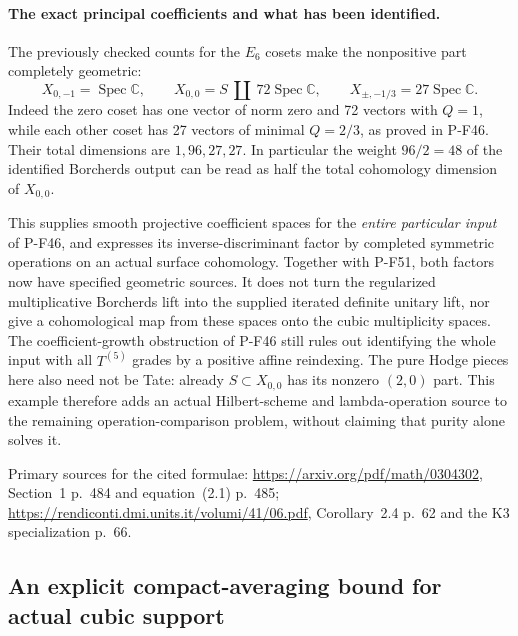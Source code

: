 \documentclass[11pt,a4paper]{article}
\begin{document}
\paragraph{The exact principal coefficients and what has been identified.}
The previously checked counts for the $E_6$ cosets
make the nonpositive part completely geometric:
\[
 X_{0,-1}=\operatorname{Spec}\mathbb C,\qquad
 X_{0,0}=S\ \coprod\ 72\operatorname{Spec}\mathbb C,
 \qquad
 X_{\pm,-1/3}=27\operatorname{Spec}\mathbb C.
                                                        \tag{P-F53g}
\]
Indeed the zero coset has one vector of norm zero
and 72 vectors with $Q=1$, while each other coset
has 27 vectors of minimal $Q=2/3$, as proved in
P-F46. Their total dimensions are $1,96,27,27$.
In particular the weight $96/2=48$ of the identified
Borcherds output can be read as half the total
cohomology dimension of $X_{0,0}$.

This supplies smooth projective coefficient spaces
for the \emph{entire particular input} of P-F46,
and expresses its inverse-discriminant factor by
completed symmetric operations on an actual
surface cohomology. Together with P-F51, both
factors now have specified geometric sources.
It does not turn the regularized multiplicative
Borcherds lift into the supplied iterated definite
unitary lift, nor give a cohomological map from
these spaces onto the cubic multiplicity spaces.
The coefficient-growth obstruction of P-F46 still
rules out identifying the whole input with all
$T^{(5)}$ grades by a positive affine reindexing.
The pure Hodge pieces here also need not be Tate:
already $S\subset X_{0,0}$ has its nonzero
$(2,0)$ part. This example therefore adds an
actual Hilbert-scheme and lambda-operation source
to the remaining operation-comparison problem,
without claiming that purity alone solves it.

Primary sources for the cited formulae:
\url{https://arxiv.org/pdf/math/0304302},
Section~1 p.~484 and equation~(2.1) p.~485;
\url{https://rendiconti.dmi.units.it/volumi/41/06.pdf},
Corollary~2.4 p.~62 and the K3 specialization p.~66.


\subsection{An explicit compact-averaging bound for actual cubic support}
\label{sec:cubic-reynolds-support}
\end{document}

